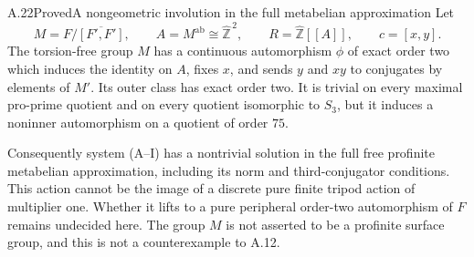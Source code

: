 \begin{statement}{A.22}{Proved}{A nongeometric involution in the full metabelian approximation}
Let
\[
 M=F/\overline{[F',F']},\qquad
 A=M^{\mathrm{ab}}\cong\widehat{\mathbb Z}^{\,2},\qquad
 R=\widehat{\mathbb Z}[[A]],\qquad c=[x,y].
\]
The torsion-free group $M$ has a continuous automorphism
$\phi$ of exact order two which induces the identity on
$A$, fixes $x$, and sends $y$ and $xy$ to conjugates by
elements of $M'$. Its outer class has exact order two.
It is trivial on every maximal pro-prime quotient and
on every quotient isomorphic to $S_3$, but it induces
a noninner automorphism on a quotient of order $75$.

Consequently system \textup{(A--I)} has a nontrivial
solution in the full free profinite metabelian
approximation, including its norm and third-conjugator
conditions. This action cannot be the image of a
discrete pure finite tripod action of multiplier one.
Whether it lifts to a pure peripheral order-two
automorphism of $F$ remains undecided here. The group
$M$ is not asserted to be a profinite surface group,
and this is not a counterexample to A.12.
\end{statement}
